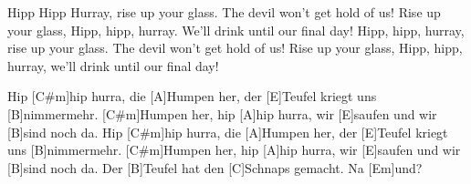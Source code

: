 \begin{guitar}
	Hipp Hipp Hurray, rise up your glass. The devil won't get hold of us!
	Rise up your glass, Hipp, hipp, hurray. We'll drink until our final day!
	Hipp, hipp, hurray, rise up your glass. The devil won't get hold of us!
	Rise up your glass, Hipp, hipp, hurray, we'll drink until our final day!
	
	Hip [C#m]hip hurra, die [A]Humpen her, der [E]Teufel kriegt uns [B]nimmermehr.
	[C#m]Humpen her, hip [A]hip hurra, wir [E]saufen und wir [B]sind noch da.
	Hip [C#m]hip hurra, die [A]Humpen her, der [E]Teufel kriegt uns [B]nimmermehr.
	[C#m]Humpen her, hip [A]hip hurra, wir [E]saufen und wir [B]sind noch da.
	Der [B]Teufel hat den [C]Schnaps gemacht. Na [Em]und?
	
	
\end{guitar}